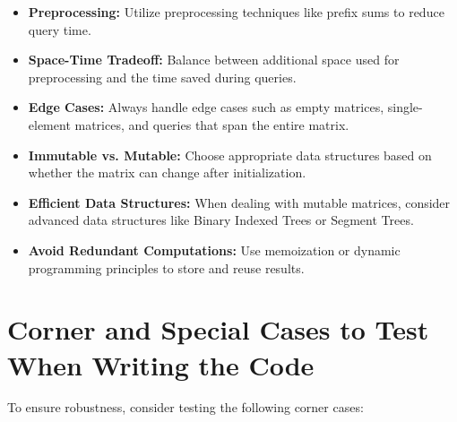 \begin{itemize}
    \item \textbf{Preprocessing:} Utilize preprocessing techniques like prefix sums to reduce query time.
    
    \item \textbf{Space-Time Tradeoff:} Balance between additional space used for preprocessing and the time saved during queries.
    
    \item \textbf{Edge Cases:} Always handle edge cases such as empty matrices, single-element matrices, and queries that span the entire matrix.
    
    \item \textbf{Immutable vs. Mutable:} Choose appropriate data structures based on whether the matrix can change after initialization.
    
    \item \textbf{Efficient Data Structures:} When dealing with mutable matrices, consider advanced data structures like Binary Indexed Trees or Segment Trees.
    
    \item \textbf{Avoid Redundant Computations:} Use memoization or dynamic programming principles to store and reuse results.
\end{itemize}

\section*{Corner and Special Cases to Test When Writing the Code}

To ensure robustness, consider testing the following corner cases:

